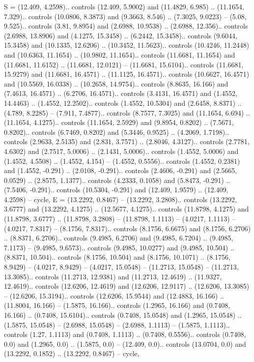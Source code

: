 {S} = {(12.409, 4.2598).. controls (12.409, 5.9002) and (11.4829, 6.985) .. (11.1654, 7.329).. controls (10.0806, 8.3873) and (9.3663, 8.546) .. (7.3025, 9.0223) -- (5.08, 9.525).. controls (3.81, 9.8954) and (2.6988, 10.9538) .. (2.6988, 12.356).. controls (2.6988, 13.8906) and (4.1275, 15.3458) .. (6.2442, 15.3458).. controls (9.6044, 15.3458) and (10.1335, 12.6206) .. (10.3452, 11.5623).. controls (10.4246, 11.2448) and (10.6363, 11.1654) .. (10.9802, 11.1654).. controls (11.6681, 11.1654) and (11.6681, 11.6152) .. (11.6681, 12.0121) -- (11.6681, 15.6104).. controls (11.6681, 15.9279) and (11.6681, 16.4571) .. (11.1125, 16.4571).. controls (10.6627, 16.4571) and (10.5569, 16.0338) .. (10.2658, 14.9754).. controls (8.8635, 16.166) and (7.4613, 16.4571) .. (6.2706, 16.4571).. controls (3.4131, 16.4571) and (1.4552, 14.4463) .. (1.4552, 12.2502).. controls (1.4552, 10.5304) and (2.6458, 8.8371) .. (4.789, 8.2285) -- (7.911, 7.4877).. controls (8.7577, 7.3025) and (11.1654, 6.694) .. (11.1654, 4.1275).. controls (11.1654, 2.5929) and (9.8954, 0.8202) .. (7.5671, 0.8202).. controls (6.7469, 0.8202) and (5.3446, 0.9525) .. (4.2069, 1.7198).. controls (2.9633, 2.5135) and (2.831, 3.7571) .. (2.8046, 4.3127).. controls (2.7781, 4.6302) and (2.7517, 5.0006) .. (2.1431, 5.0006).. controls (1.4552, 5.0006) and (1.4552, 4.5508) .. (1.4552, 4.154) -- (1.4552, 0.5556).. controls (1.4552, 0.2381) and (1.4552, -0.291) .. (2.0108, -0.291).. controls (2.4606, -0.291) and (2.5665, 0.0529) .. (2.8575, 1.1377).. controls (4.2333, 0.1058) and (5.8473, -0.291) .. (7.5406, -0.291).. controls (10.5304, -0.291) and (12.409, 1.9579) .. (12.409, 4.2598) -- cycle},
{E} = {(13.2292, 0.8467) -- (13.2292, 3.2808).. controls (13.2292, 3.6777) and (13.2292, 4.1275) .. (12.5677, 4.1275).. controls (11.8798, 4.1275) and (11.8798, 3.6777) .. (11.8798, 3.2808) -- (11.8798, 1.1113) -- (4.0217, 1.1113) -- (4.0217, 7.8317) -- (8.1756, 7.8317).. controls (8.1756, 6.6675) and (8.1756, 6.2706) .. (8.8371, 6.2706).. controls (9.4985, 6.2706) and (9.4985, 6.7204) .. (9.4985, 7.1173) -- (9.4985, 9.6573).. controls (9.4985, 10.0277) and (9.4985, 10.504) .. (8.8371, 10.504).. controls (8.1756, 10.504) and (8.1756, 10.1071) .. (8.1756, 8.9429) -- (4.0217, 8.9429) -- (4.0217, 15.0548) -- (11.2713, 15.0548) -- (11.2713, 13.3085).. controls (11.2713, 12.9381) and (11.2713, 12.4619) .. (11.9327, 12.4619).. controls (12.6206, 12.4619) and (12.6206, 12.9117) .. (12.6206, 13.3085) -- (12.6206, 15.3194).. controls (12.6206, 15.9544) and (12.4883, 16.166) .. (11.8004, 16.166) -- (1.5875, 16.166).. controls (1.2965, 16.166) and (0.7408, 16.166) .. (0.7408, 15.6104).. controls (0.7408, 15.0548) and (1.2965, 15.0548) .. (1.5875, 15.0548) -- (2.6988, 15.0548) -- (2.6988, 1.1113) -- (1.5875, 1.1113).. controls (1.27, 1.1113) and (0.7408, 1.1113) .. (0.7408, 0.5556).. controls (0.7408, 0.0) and (1.2965, 0.0) .. (1.5875, 0.0) -- (12.409, 0.0).. controls (13.0704, 0.0) and (13.2292, 0.1852) .. (13.2292, 0.8467) -- cycle},
